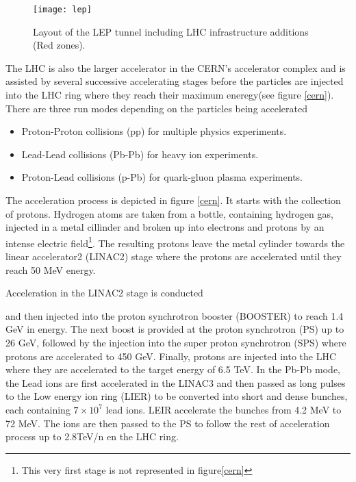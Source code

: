 \begin{figure}[!h]
\centering
\texttt{[image: lep]}
\caption[Layout of the LEP tunnel including LHC infrastructure additions]{Layout of the LEP tunnel including LHC infrastructure additions (Red zones).\cite{lep}}\label{fig:lep}
\end{figure}

\noindent The LHC is also the larger accelerator in the CERN's accelerator complex and is assisted by several successive accelerating stages before the particles are injected into the LHC ring where they reach their maximum eneregy(see figure \ref{cern}). There are three run modes depending on the particles being accelerated

\begin{itemize}
\item Proton-Proton collisions (pp) for multiple physics experiments.
\item Lead-Lead collisions (Pb-Pb) for heavy ion experiments. 
\item Proton-Lead collisions (p-Pb) for quark-gluon plasma experiments.
\end{itemize}

\noindent The acceleration process is depicted in figure \ref{cern}. It starts with the collection of protons. Hydrogen atoms are taken from a bottle, containing hydrogen gas, injected in a metal cillinder and broken up into electrons and protons by an intense electric field\footnote{This very first stage is not represented in figure\ref{cern}}. The resulting protons leave the metal cylinder towards the linear accelerator2 (LINAC2) stage where the protons are accelerated until they reach 50 MeV energy.

\noindent Acceleration in the LINAC2 stage is conducted   



and then injected into the proton synchrotron booster (BOOSTER) to reach 1.4 GeV in energy. The next boost is provided at the proton synchrotron (PS) up to 26 GeV, followed by the injection into the super proton synchrotron (SPS) where protons are accelerated to 450 GeV. Finally, protons are injected into the LHC where they are accelerated to the target energy of 6.5 TeV. In the Pb-Pb mode, the Lead ions are first accelerated in the LINAC3 and then passed as long pulses to the Low energy ion ring (LIER) to be converted into short and dense bunches, each containing $7\times10^7$ lead ions. LEIR accelerate the bunches from 4.2 MeV to 72 MeV. The ions are then passed to the PS to follow the rest of acceleration process up to 2.8TeV/n en the LHC ring. 

